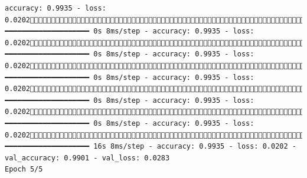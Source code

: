 \documentclass[
  letterpaper,
  DIV=11,
  numbers=noendperiod]{scrreprt}
\begin{document}
\begin{verbatim}
accuracy: 0.9935 - loss: 0.02021848/1875 ━━━━━━━━━━━━━━━━━━━━ 0s 8ms/step - accuracy: 0.9935 - loss: 0.02021856/1875 ━━━━━━━━━━━━━━━━━━━━ 0s 8ms/step - accuracy: 0.9935 - loss: 0.02021863/1875 ━━━━━━━━━━━━━━━━━━━━ 0s 8ms/step - accuracy: 0.9935 - loss: 0.02021868/1875 ━━━━━━━━━━━━━━━━━━━━ 0s 8ms/step - accuracy: 0.9935 - loss: 0.02021875/1875 ━━━━━━━━━━━━━━━━━━━━ 0s 8ms/step - accuracy: 0.9935 - loss: 0.02021875/1875 ━━━━━━━━━━━━━━━━━━━━ 16s 8ms/step - accuracy: 0.9935 - loss: 0.0202 - val_accuracy: 0.9901 - val_loss: 0.0283
Epoch 5/5

\end{verbatim}
\end{document}
